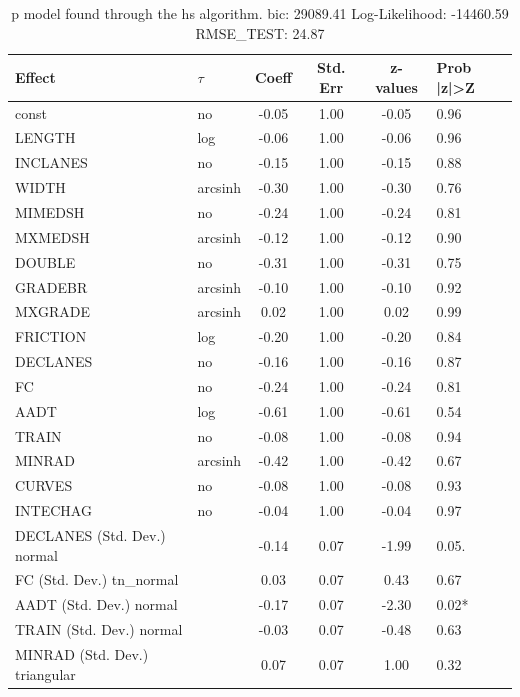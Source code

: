 \begin{table}
	\caption{p model found through the hs algorithm. bic: 29089.41 Log-Likelihood: -14460.59 RMSE_TEST: 24.87}
	\begin{center}
		\begin{tabular}{|l|l|c|c|c|l|}
			\hline
			Effect & $\tau$ & Coeff & Std. Err & z-values & Prob |z|>Z \\
			\hline
			const & no & -0.05 & 1.00 & -0.05 & 0.96 \\
			\hline
			LENGTH & log & -0.06 & 1.00 & -0.06 & 0.96 \\
			\hline
			INCLANES & no & -0.15 & 1.00 & -0.15 & 0.88 \\
			\hline
			WIDTH & arcsinh & -0.30 & 1.00 & -0.30 & 0.76 \\
			\hline
			MIMEDSH & no & -0.24 & 1.00 & -0.24 & 0.81 \\
			\hline
			MXMEDSH & arcsinh & -0.12 & 1.00 & -0.12 & 0.90 \\
			\hline
			DOUBLE & no & -0.31 & 1.00 & -0.31 & 0.75 \\
			\hline
			GRADEBR & arcsinh & -0.10 & 1.00 & -0.10 & 0.92 \\
			\hline
			MXGRADE & arcsinh & 0.02 & 1.00 & 0.02 & 0.99 \\
			\hline
			FRICTION & log & -0.20 & 1.00 & -0.20 & 0.84 \\
			\hline
			DECLANES & no & -0.16 & 1.00 & -0.16 & 0.87 \\
			\hline
			FC & no & -0.24 & 1.00 & -0.24 & 0.81 \\
			\hline
			AADT & log & -0.61 & 1.00 & -0.61 & 0.54 \\
			\hline
			TRAIN & no & -0.08 & 1.00 & -0.08 & 0.94 \\
			\hline
			MINRAD & arcsinh & -0.42 & 1.00 & -0.42 & 0.67 \\
			\hline
			CURVES & no & -0.08 & 1.00 & -0.08 & 0.93 \\
			\hline
			INTECHAG & no & -0.04 & 1.00 & -0.04 & 0.97 \\
			\hline
			DECLANES (Std. Dev.) normal &  & -0.14 & 0.07 & -1.99 & 0.05. \\
			\hline
			FC (Std. Dev.) tn_normal &  & 0.03 & 0.07 & 0.43 & 0.67 \\
			\hline
			AADT (Std. Dev.) normal &  & -0.17 & 0.07 & -2.30 & 0.02* \\
			\hline
			TRAIN (Std. Dev.) normal &  & -0.03 & 0.07 & -0.48 & 0.63 \\
			\hline
			MINRAD (Std. Dev.) triangular &  & 0.07 & 0.07 & 1.00 & 0.32 \\

\end{tabular}
\end{center}
\end{table}
